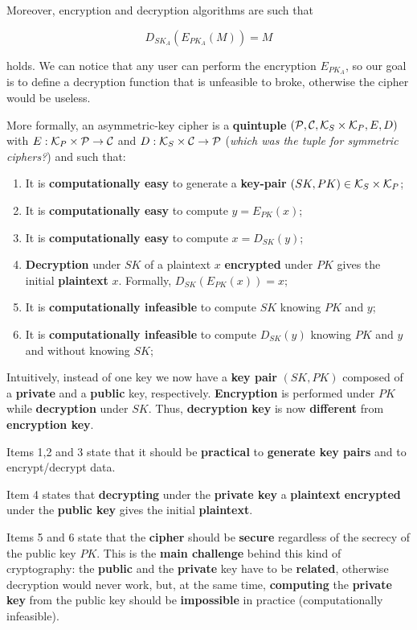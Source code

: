 Moreover, encryption and decryption algorithms are such that

$$D_{SK_A}(E_{PK_A}(M))=M$$

holds. We can notice that any user can perform the encryption $E_{PK_A}$, so our goal is to define a decryption function that is unfeasible to broke, otherwise the cipher would be useless.

More formally, an asymmetric-key cipher is a \textbf{quintuple} $({\cal P},{\cal C},{\cal K}_S\times{\cal K}_P,E,D)$ with $E : {\cal K}_P \times {\cal P} \rightarrow {\cal C}$ and $D : {\cal K}_S \times {\cal C} \rightarrow {\cal P}$ (\textit{which was the tuple for symmetric ciphers?}) and such that:

\begin{enumerate}
    \item It is \textbf{computationally easy} to generate a \textbf{key-pair} $(SK, PK) \in{\cal K}_S\times{\cal K}_P$;
    \item It is \textbf{computationally easy} to compute $y = E_{PK}(x)$;
    \item It is \textbf{computationally easy} to compute $x = D_{SK}(y)$;
    \item \textbf{Decryption} under $SK$ of a plaintext $x$ \textbf{encrypted} under $PK$ gives the initial \textbf{plaintext} $x$. Formally, $D_{SK}(E_{PK}(x)) = x$;
    \item It is \textbf{computationally infeasible} to compute $SK$ knowing $PK$ and $y$;
    \item It is \textbf{computationally infeasible} to compute $D_{SK}(y)$ knowing $PK$ and $y$ and without knowing $SK$;
\end{enumerate}

Intuitively, instead of one key we now have a \textbf{key pair} $(SK,PK)$ composed of a \textbf{private} and a \textbf{public} key, respectively. \textbf{Encryption} is performed under $PK$ while \textbf{decryption} under $SK$. Thus, \textbf{decryption key} is now \textbf{different} from \textbf{encryption key}. 

Items 1,2 and 3 state that it should be \textbf{practical} to \textbf{generate key pairs} and to encrypt/decrypt data. 

Item 4 states that \textbf{decrypting} under the \textbf{private key} a \textbf{plaintext} \textbf{encrypted} under the \textbf{public key} gives the initial \textbf{plaintext}.

Items 5 and 6 state that the \textbf{cipher} should be \textbf{secure} regardless of the secrecy of the public key $PK$.  This is the \textbf{main challenge} behind this kind of cryptography: the \textbf{public} and the \textbf{private} key have to be \textbf{related}, otherwise decryption would never work, but, at the same time, \textbf{computing} the \textbf{private key} from the public key should be \textbf{impossible} in practice (computationally infeasible).

